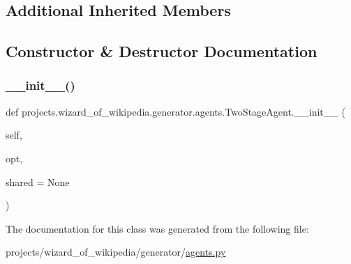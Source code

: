 \subsection*{Additional Inherited Members}


\subsection{Constructor \& Destructor Documentation}
\mbox{\label{classprojects_1_1wizard__of__wikipedia_1_1generator_1_1agents_1_1TwoStageAgent_a5aae49d192aac40f8fde1b1c42409261}} 
\subsubsection{\texorpdfstring{\+\_\+\+\_\+init\+\_\+\+\_\+()}{\_\_init\_\_()}}
{\footnotesize\ttfamily def projects.\+wizard\+\_\+of\+\_\+wikipedia.\+generator.\+agents.\+Two\+Stage\+Agent.\+\_\+\+\_\+init\+\_\+\+\_\+ (\begin{DoxyParamCaption}\item[{}]{self,  }\item[{}]{opt,  }\item[{}]{shared = {\ttfamily None} }\end{DoxyParamCaption})}



The documentation for this class was generated from the following file\+:\begin{DoxyCompactItemize}
\item 
projects/wizard\+\_\+of\+\_\+wikipedia/generator/\hyperlink{projects_2wizard__of__wikipedia_2generator_2agents_8py}{agents.\+py}\end{DoxyCompactItemize}
